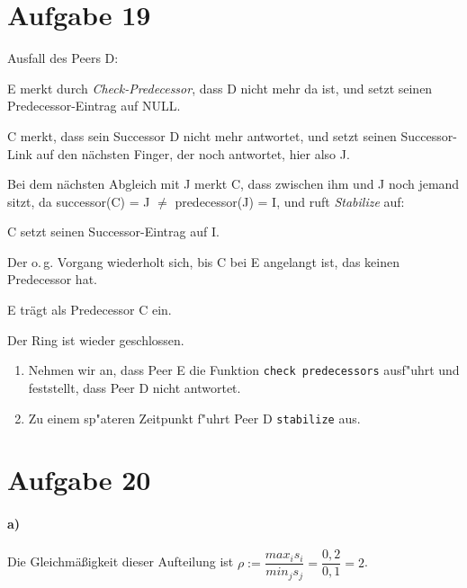 \documentclass[10pt,a4paper]{article}
\begin{document}
\section*{Aufgabe 19} 
Ausfall des Peers D:
\begin{compactitem} [–]
	\item E merkt durch \textit{Check-Predecessor}, dass D nicht mehr da ist, und setzt seinen Predecessor-Eintrag auf NULL.
	\item C merkt, dass sein Successor D nicht mehr antwortet, und setzt seinen Successor-Link auf den nächsten Finger, der noch antwortet, hier also J.
	\item Bei dem nächsten Abgleich mit J merkt C, dass zwischen ihm und J noch jemand sitzt, da successor(C) = J $\neq$ predecessor(J) = I, und ruft \textit{Stabilize} auf:
	\begin{compactitem}
		\item C setzt seinen Successor-Eintrag auf I.
		\item Der o.\,g. Vorgang wiederholt sich, bis C bei E angelangt ist, das keinen Predecessor hat. 
		\item E trägt als Predecessor C ein.
	\end{compactitem}
	\item Der Ring ist wieder geschlossen.
\end{compactitem}


\begin{enumerate}

\item Nehmen wir an, dass Peer E die Funktion \verb!check predecessors! ausf"uhrt und feststellt, dass Peer D nicht antwortet.  
\item Zu einem sp"ateren Zeitpunkt f"uhrt Peer D \verb!stabilize! aus.  
\end{enumerate}

\section*{Aufgabe 20}
\paragraph*{a)} Die Gleichmäßigkeit dieser Aufteilung ist
$ρ:=\dfrac{max_i s_i}{min_j s_j} = \dfrac{0,2}{0,1} = 2$\quad.
\end{document}
